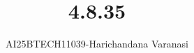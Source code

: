 \documentclass[journal]{IEEEtran}
\begin{document}

\vspace{3cm}

\title{4.8.35}
\author{AI25BTECH11039-Harichandana Varanasi}
 \maketitle
{\let\newpage\relax\maketitle}

\renewcommand{\thefigure}{\theenumi}
\renewcommand{\thetable}{\theenumi}
\setlength{\intextsep}{10pt} %


\renewcommand{\thetable}{\theenumi}



\date{}
\end{document}
